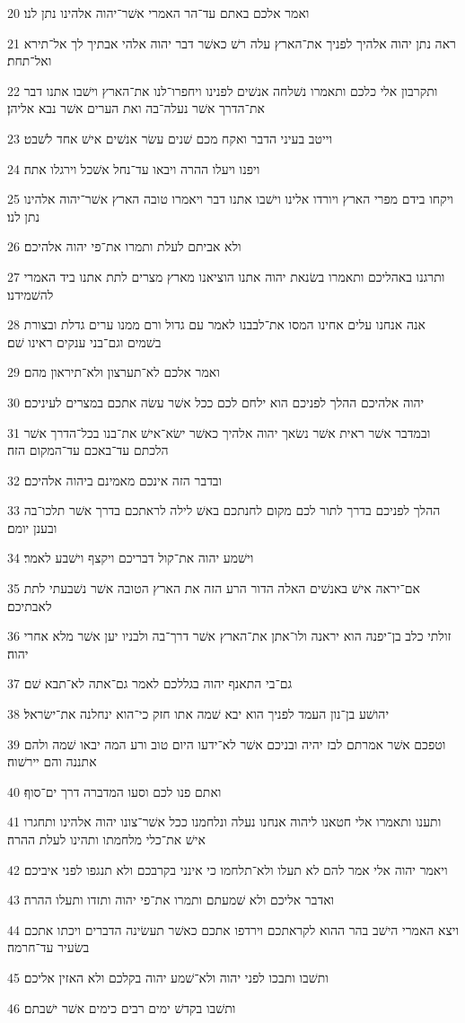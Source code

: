 \par 20 ואמר אלכם באתם עד־הר האמרי אשׁר־יהוה אלהינו נתן לנו׃
\par 21 ראה נתן יהוה אלהיך לפניך את־הארץ עלה רשׁ כאשׁר דבר יהוה אלהי אבתיך לך אל־תירא ואל־תחת׃
\par 22 ותקרבון אלי כלכם ותאמרו נשׁלחה אנשׁים לפנינו ויחפרו־לנו את־הארץ וישׁבו אתנו דבר את־הדרך אשׁר נעלה־בה ואת הערים אשׁר נבא אליהן׃
\par 23 וייטב בעיני הדבר ואקח מכם שׁנים עשׂר אנשׁים אישׁ אחד לשׁבט׃
\par 24 ויפנו ויעלו ההרה ויבאו עד־נחל אשׁכל וירגלו אתה׃
\par 25 ויקחו בידם מפרי הארץ ויורדו אלינו וישׁבו אתנו דבר ויאמרו טובה הארץ אשׁר־יהוה אלהינו נתן לנו׃
\par 26 ולא אביתם לעלת ותמרו את־פי יהוה אלהיכם׃
\par 27 ותרגנו באהליכם ותאמרו בשׂנאת יהוה אתנו הוציאנו מארץ מצרים לתת אתנו ביד האמרי להשׁמידנו׃
\par 28 אנה אנחנו עלים אחינו המסו את־לבבנו לאמר עם גדול ורם ממנו ערים גדלת ובצורת בשׁמים וגם־בני ענקים ראינו שׁם׃
\par 29 ואמר אלכם לא־תערצון ולא־תיראון מהם׃
\par 30 יהוה אלהיכם ההלך לפניכם הוא ילחם לכם ככל אשׁר עשׂה אתכם במצרים לעיניכם׃
\par 31 ובמדבר אשׁר ראית אשׁר נשׂאך יהוה אלהיך כאשׁר ישׂא־אישׁ את־בנו בכל־הדרך אשׁר הלכתם עד־באכם עד־המקום הזה׃
\par 32 ובדבר הזה אינכם מאמינם ביהוה אלהיכם׃
\par 33 ההלך לפניכם בדרך לתור לכם מקום לחנתכם באשׁ לילה לראתכם בדרך אשׁר תלכו־בה ובענן יומם׃
\par 34 וישׁמע יהוה את־קול דבריכם ויקצף וישׁבע לאמר׃
\par 35 אם־יראה אישׁ באנשׁים האלה הדור הרע הזה את הארץ הטובה אשׁר נשׁבעתי לתת לאבתיכם׃
\par 36 זולתי כלב בן־יפנה הוא יראנה ולו־אתן את־הארץ אשׁר דרך־בה ולבניו יען אשׁר מלא אחרי יהוה׃
\par 37 גם־בי התאנף יהוה בגללכם לאמר גם־אתה לא־תבא שׁם׃
\par 38 יהושׁע בן־נון העמד לפניך הוא יבא שׁמה אתו חזק כי־הוא ינחלנה את־ישׂראל׃
\par 39 וטפכם אשׁר אמרתם לבז יהיה ובניכם אשׁר לא־ידעו היום טוב ורע המה יבאו שׁמה ולהם אתננה והם יירשׁוה׃
\par 40 ואתם פנו לכם וסעו המדברה דרך ים־סוף׃
\par 41 ותענו ותאמרו אלי חטאנו ליהוה אנחנו נעלה ונלחמנו ככל אשׁר־צונו יהוה אלהינו ותחגרו אישׁ את־כלי מלחמתו ותהינו לעלת ההרה׃
\par 42 ויאמר יהוה אלי אמר להם לא תעלו ולא־תלחמו כי אינני בקרבכם ולא תנגפו לפני איביכם׃
\par 43 ואדבר אליכם ולא שׁמעתם ותמרו את־פי יהוה ותזדו ותעלו ההרה׃
\par 44 ויצא האמרי הישׁב בהר ההוא לקראתכם וירדפו אתכם כאשׁר תעשׂינה הדברים ויכתו אתכם בשׂעיר עד־חרמה׃
\par 45 ותשׁבו ותבכו לפני יהוה ולא־שׁמע יהוה בקלכם ולא האזין אליכם׃
\par 46 ותשׁבו בקדשׁ ימים רבים כימים אשׁר ישׁבתם׃

